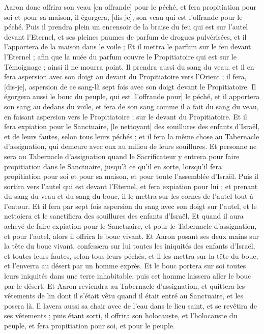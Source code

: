 \begin{multicols}{2}
Aaron donc offrira son veau [en offrande] pour le péché, et fera propitiation pour soi et pour sa maison, il égorgera, [dis-je], son veau qui est l'offrande pour le péché.
Puis il prendra plein un encensoir de la braise du feu qui est sur l'autel devant l'Eternel, et ses pleines paumes de parfum de drogues pulvérisées, et il l'apportera de la maison dans le voile ;
Et il mettra le parfum sur le feu devant l'Eternel ; afin que la nuée du parfum couvre le Propitiatoire qui est sur le Témoignage ; ainsi il ne mourra point.
Il prendra aussi du sang du veau, et il en fera aspersion avec son doigt au devant du Propitiatoire vers l'Orient ; il fera, [dis-je], aspersion de ce sang-là sept fois avec son doigt devant le Propitiatoire.
Il égorgera aussi le bouc du peuple, qui est [l'offrande pour] le péché, et il apportera son sang au dedans du voile, et fera de son sang comme il a fait du sang du veau, en faisant aspersion vers le Propitiatoire ; sur le devant du Propitiatoire.
Et il fera expiation pour le Sanctuaire, [le nettoyant] des souillures des enfants d'Israël, et de leurs fautes, selon tous leurs péchés ; et il fera la même chose au Tabernacle d'assignation, qui demeure avec eux au milieu de leurs souillures.
Et personne ne sera au Tabernacle d'assignation quand le Sacrificateur y entrera pour faire propitiation dans le Sanctuaire, jusqu'à ce qu'il en sorte, lorsqu'il fera propitiation pour soi et pour sa maison, et pour toute l'assemblée d'Israël.
Puis il sortira vers l'autel qui est devant l'Eternel, et fera expiation pour lui ; et prenant du sang du veau et du sang du bouc, il le mettra sur les cornes de l'autel tout à l'entour.
Et il fera par sept fois aspersion du sang avec son doigt sur l'autel, et le nettoiera et le sanctifiera des souillures des enfants d'Israël.
Et quand il aura achevé de faire expiation pour le Sanctuaire, et pour le Tabernacle d'assignation, et pour l'autel, alors il offrira le bouc vivant.
Et Aaron posant ses deux mains sur la tête du bouc vivant, confessera sur lui toutes les iniquités des enfants d'Israël, et toutes leurs fautes, selon tous leurs péchés, et il les mettra sur la tête du bouc, et l'enverra au désert par un homme exprès.
Et le bouc portera sur soi toutes leurs iniquités dans une terre inhabitable, puis cet homme laissera aller le bouc par le désert.
Et Aaron reviendra au Tabernacle d'assignation, et quittera les vêtements de lin dont il s'était vêtu quand il était entré au Sanctuaire, et les posera là.
Il lavera aussi sa chair avec de l'eau dans le lieu saint, et se revêtira de ses vêtements ; puis étant sorti, il offrira son holocauste, et l'holocauste du peuple, et fera propitiation pour soi, et pour le peuple.

\end{multicols}
